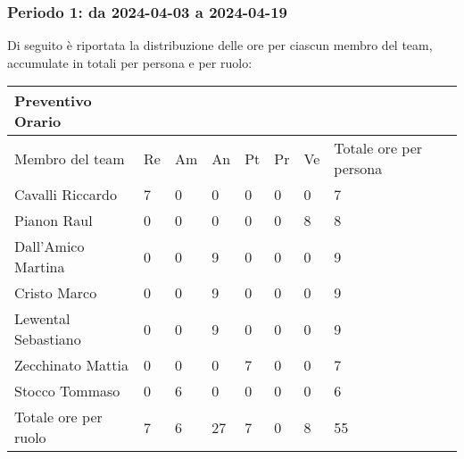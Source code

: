 \subsubsection{Periodo 1: da 2024-04-03 a 2024-04-19}
Di seguito è riportata la distribuzione delle ore per ciascun membro del team, accumulate in totali per persona e per ruolo:

\begin{table}[!ht]
  \centering
  \begin{tabular}{|l|l|l|l|l|l|l|l|}
  \hline
      \textbf{Preventivo Orario} & \textbf{} & \textbf{} & \textbf{} & \textbf{} & \textbf{} & \textbf{} & \textbf{} \\ \hline
      Membro del team & Re & Am & An & Pt & Pr & Ve & Totale ore per persona \\ \hline
      Cavalli Riccardo & 7 & 0 & 0 & 0 & 0 & 0 & 7 \\ \hline
      Pianon Raul & 0 & 0 & 0 & 0 & 0 & 8 & 8 \\ \hline
      Dall'Amico Martina & 0 & 0 & 9 & 0 & 0 & 0 & 9 \\ \hline
      Cristo Marco & 0 & 0 & 9 & 0 & 0 & 0 & 9 \\ \hline
      Lewental Sebastiano & 0 & 0 & 9 & 0 & 0 & 0 & 9 \\ \hline
      Zecchinato Mattia & 0 & 0 & 0 & 7 & 0 & 0 & 7 \\ \hline
      Stocco Tommaso & 0 & 6 & 0 & 0 & 0 & 0 & 6 \\ \hline
      Totale ore per ruolo & 7 & 6 & 27 & 7 & 0 & 8 & 55 \\ \hline
  \end{tabular}
\end{table}